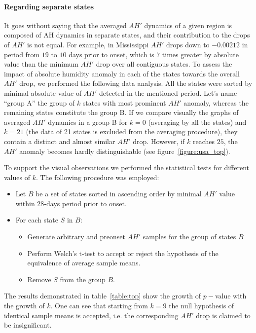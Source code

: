 \documentclass[3p,times,procedia]{elsarticle}
\begin{document}
\paragraph{Regarding separate states}

It goes without saying that the averaged $AH'$ dynamics of a given region is composed of AH dynamics in separate states, and their contribution to the drops of $AH'$ is not equal. For example, in Mississippi $AH'$ drops down to $-0.00212$ in period from $19$ to $10$ days prior to onset, which is $7$ times greater by absolute value than the minimum $AH'$ drop over all contiguous states. To assess the impact of absolute humidity anomaly in each of the states towards the overall $AH'$ drop, we performed the following data analysis. All the states were sorted by minimal absolute value of $AH'$ detected in the mentioned period. Let's name ``group A'' the group of $k$ states with most prominent $AH'$ anomaly, whereas the remaining states constitute the group B. If we compare visually the graphs of averaged $AH'$ dynamics in a group B for $k=0$ (averaging by all the states) and $k = 21$ (the data of 21 states is excluded from the averaging procedure), they contain a distinct and almost similar $AH'$ drop. However, if $k$ reaches $25$, the $AH'$ anomaly becomes hardly distinguishable (see figure~\ref{figure:usa_top}).



To support the visual observations we performed the statistical tests for different values of $k$. The following procedure was employed:
\begin{itemize}
	\item Let $B$ be a set of states sorted in ascending order by minimal $AH'$ value within 28-days period prior to onset.
	\item For each state $S$ in $B$:
	\begin{itemize}
		\item Generate arbitrary and preonset $AH'$ samples
			for the group of states $B$
		\item Perform  Welch's t-test to accept or reject the hypothesis of the equivalence of average sample means.
		\item Remove $S$ from the group $B$.
	\end{itemize}
\end{itemize}

The results demonstrated in table~\ref{table:top} show the growth of $p-$value with the growth of $k$. One can see that starting from $k = 9$ the null hypothesis of identical sample means is accepted, i.e. the corresponding $AH'$ drop is claimed to be insignificant.
\end{document}
